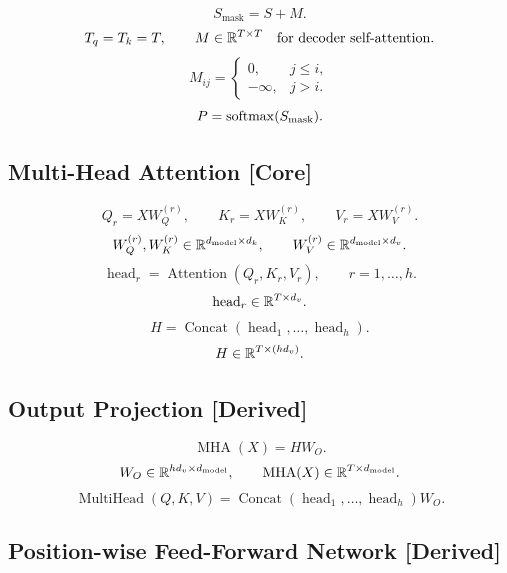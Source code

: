\[
S_{\mathrm{mask}}
=
S+M.
\]
\[
T_q=T_k=T,
\qquad
M \in \mathbb{R}^{T \times T}
\quad
\text{for decoder self-attention}.
\]
\[
M_{ij}
=
\begin{cases}
0, & j \leq i, \\
-\infty, & j > i.
\end{cases}
\]
\[
P
=
\operatorname{softmax}(S_{\mathrm{mask}}).
\]

\subsection{Multi-Head Attention \textbf{[Core]}}

\[
Q_r = XW_Q^{(r)},
\qquad
K_r = XW_K^{(r)},
\qquad
V_r = XW_V^{(r)}.
\]
\[
W_Q^{(r)},W_K^{(r)}
\in
\mathbb{R}^{d_{\mathrm{model}} \times d_k},
\qquad
W_V^{(r)}
\in
\mathbb{R}^{d_{\mathrm{model}} \times d_v}.
\]
\[
\operatorname{head}_r
=
\operatorname{Attention}
\left(
Q_r,K_r,V_r
\right),
\qquad
r=1,\dots,h.
\]
\[
\operatorname{head}_r
\in
\mathbb{R}^{T \times d_v}.
\]
\[
H
=
\operatorname{Concat}
\left(
\operatorname{head}_1,\dots,\operatorname{head}_h
\right).
\]
\[
H \in \mathbb{R}^{T \times (h d_v)}.
\]

\subsection{Output Projection \textbf{[Derived]}}

\[
\operatorname{MHA}(X)
=
H W_O.
\]
\[
W_O
\in
\mathbb{R}^{h d_v \times d_{\mathrm{model}}},
\qquad
\operatorname{MHA}(X)
\in
\mathbb{R}^{T \times d_{\mathrm{model}}}.
\]
\[
\operatorname{MultiHead}(Q,K,V)
=
\operatorname{Concat}
(\operatorname{head}_1,\dots,\operatorname{head}_h)W_O.
\]

\subsection{Position-wise Feed-Forward Network \textbf{[Derived]}}

